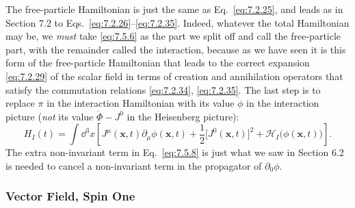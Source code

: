 The free-particle Hamiltonian is just the same as Eq.~\eqref{eq:7.2.25}, and leads
as in Section 7.2 to Eqs.~\eqref{eq:7.2.26}--\eqref{eq:7.2.35}. Indeed, whatever the total
Hamiltonian may be, we \emph{must} take \eqref{eq:7.5.6} as the part we split off and
call the free-particle part, with the remainder called the interaction,
because as we have seen it is this form of the free-particle Hamiltonian that
leads to the correct expansion \eqref{eq:7.2.29} of the scalar field in terms of
creation and annihilation operators that satisfy the commutation relations
\eqref{eq:7.2.34}, \eqref{eq:7.2.35}. The last step is to replace $\pi$ in the interaction
Hamiltonian with its value $\dot\phi$ in the interaction picture (\emph{not}
its value $\dot\Phi-J^0$ in the Heisenberg picture):
\begin{equation}
H_I(t)=\int \dd^3x\left[J^\mu(\mathbf x,t)\partial_\mu\phi(\mathbf x,t)
+\frac12\bigl[J^0(\mathbf x,t)\bigr]^2
+\mathcal H_I\bigl(\phi(\mathbf x,t)\bigr)\right].
\tag{7.5.8}\label{eq:7.5.8}
\end{equation}
The extra non-invariant term in Eq.~\eqref{eq:7.5.8} is just what we saw in Section
6.2 is needed to cancel a non-invariant term in the propagator of
$\partial_0\phi$.

\subsubsection*{Vector Field, Spin One}


